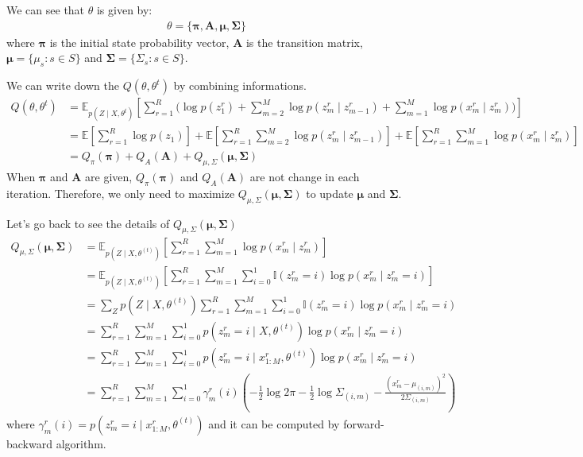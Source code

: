\documentclass[12pt]{article}
\newenvironment{problem}[2][Problem]{\begin{trivlist}
\item[\hskip \labelsep {\bfseries #1}\hskip \labelsep {\bfseries #2.}]}{\end{trivlist}}
\begin{document}
\begin{problem}{2.6.18}
We can see that $\theta$ is given by:
\begin{align*}
    \theta = \{\bm{\pi}, \bm{A}, \bm{\mu}, \bm{\Sigma}\}
\end{align*}
where $\bm{\pi}$ is the initial state probability vector, $\bm{A}$ is the transition
matrix, $\bm{\mu} = \{ \mu_s: s \in S\}$ and $\bm{\Sigma} = \{ \Sigma_s: s \in S\}$.

We can write down the $Q(\theta, \theta^{t})$ by combining informations.
\begin{align*}
    Q(\theta, \theta^{t}) &= 
    \mathbb{E}_{p(Z\mid X, \theta^{t})}[ \sum_{r=1}^{R} \biggl(
        \log p(z^r_1) 
        + \sum_{m=2}^{M} \log p(z^r_m \mid z^r_{m-1}) 
        + \sum_{m=1}^{M} \log p(x^r_m\mid z^r_m)\biggl)] \\
    &= \mathbb{E}[\sum_{r=1}^{R} \log p(z_1)] 
        + \mathbb{E}[\sum_{r=1}^{R} \sum_{m=2}^{M} \log p(z^r_m \mid z^r_{m-1})] 
        + \mathbb{E}[\sum_{r=1}^{R} \sum_{m=1}^{M} \log p(x^r_m\mid z^r_m)] \\
    &= Q_{\pi}(\bm{\pi}) + Q_{A}(\bm{A}) + Q_{\mu, \Sigma}(\bm{\mu}, \bm{\Sigma})
\end{align*}
When $\bm{\pi}$ and $\bm{A}$ are given, $Q_{\pi}(\bm{\pi})$ and $Q_{A}(\bm{A})$ 
are not change in each iteration. Therefore, we only need to maximize 
$Q_{\mu, \Sigma}(\bm{\mu}, \bm{\Sigma})$ to update $\bm{\mu}$ and $\bm{\Sigma}$.

Let's go back to see the details of $Q_{\mu, \Sigma}(\bm{\mu}, \bm{\Sigma})$ 
\begin{align*}
    Q_{\mu, \Sigma}(\bm{\mu}, \bm{\Sigma}) 
    &= \mathbb{E}_{p(Z\mid X, \theta^{(t)})}[
            \sum_{r=1}^{R} \sum_{m=1}^{M} \log p(x^r_m\mid z^r_m)] \\
    &= \mathbb{E}_{p(Z\mid X, \theta^{(t)})}[
                \sum_{r=1}^{R} \sum_{m=1}^{M} \sum_{i=0}^{1} \mathbb{I}(z^r_m = i)\log p(x^r_m\mid z^r_m = i)] \\
    &= \sum_{Z} p(Z\mid X, \theta^{(t)})
            \sum_{r=1}^{R} \sum_{m=1}^{M} \sum_{i=0}^{1} \mathbb{I}(z^r_m = i)\log p(x^r_m\mid z^r_m = i) \\
    &= \sum_{r=1}^{R} \sum_{m=1}^{M} \sum_{i=0}^{1} p(z^r_m = i\mid X, \theta^{(t)})\log p(x^r_m\mid z^r_m = i) \\
    &= \sum_{r=1}^{R} \sum_{m=1}^{M} \sum_{i=0}^{1} p(z^r_m = i\mid x^{r}_{1:M}, \theta^{(t)})\log p(x^r_m\mid z^r_m = i) \\
    &= \sum_{r=1}^{R} \sum_{m=1}^{M} \sum_{i=0}^{1} \gamma^{r}_{m}(i)
        (-\frac{1}{2}\log 2\pi -\frac{1}{2}\log \Sigma_{(i,m)} - \frac{(x^r_m - \mu_{(i,m)})^2}{2\Sigma_{(i,m)}})
\end{align*}
where $\gamma^{r}_{m}(i) = p(z^r_m = i\mid x^{r}_{1:M}, \theta^{(t)})$ and it can be computed
by forward-backward algorithm.


\end{problem}
\end{document}
